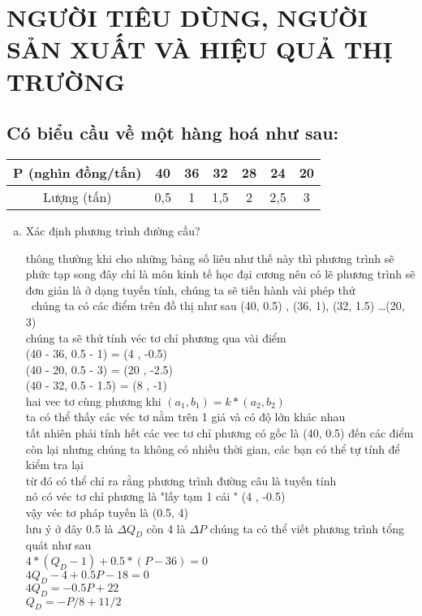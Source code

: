
\chapter{NGƯỜI TIÊU DÙNG, NGƯỜI SẢN XUẤT VÀ HIỆU QUẢ THỊ TRƯỜNG}
\section{  Có biểu cầu về một hàng hoá như sau:}

\begin{tabular}{|c|c|c|c|c|c|c|}
  \hline
  P (nghìn đồng/tấn) & 40  & 36 & 32  & 28 & 24  & 20 \\
  \hline
  Lượng (tấn)        & 0,5 & 1  & 1,5 & 2  & 2,5 & 3  \\
  \hline
\end{tabular}
\begin{enumerate}[a.]
  \item  Xác định phương trình đường cầu?

        thông thường khi cho những bảng số liêu như thế này thì phương trình sẽ phức tạp
        song đây chỉ là môn kinh tế học đại cương nên có lẽ phương trình sẽ đơn giản là ở
        dạng tuyến tính, chúng ta sẽ tiến hành vài phép thử \\\
        chúng ta có các điểm trên đồ thị như sau (40, 0.5) , (36, 1), (32, 1.5) \dots (20, 3) \\
        chúng ta sẽ thử tính véc tơ chỉ phương qua vài điểm \\
        (40 - 36, 0.5 - 1) = (4 , -0.5)\\
        (40 - 20, 0.5 - 3) = (20 , -2.5)\\
        (40 - 32, 0.5 - 1.5) = (8 , -1)\\
         hai vec tơ cùng phương khi $(a_1, b_1) = k * (a_2, b_2) $\\
        ta có thể thấy các véc tơ nằm trên 1 giá và có độ lớn khác nhau \\
        tất nhiên phải tính hết các vec tơ chỉ phương có gốc là (40, 0.5) đến các điểm còn lại
        nhưng chúng ta không có nhiều thời gian, các bạn có thể tự tính để kiểm tra lại \\
        từ đó có thể chỉ ra rằng phương trình đường câu là tuyến tính \\
        nó có véc tơ chỉ phương là "lấy tạm 1 cái "  (4 , -0.5) \\
        vậy véc tơ pháp tuyến là (0.5, 4) \\
        lưu ý ở đây 0.5 là $\Delta Q_D$ còn 4 là $\Delta P$
        chúng ta có thể viết phương trình tổng quát như sau \\
        $4 * (Q_D - 1) + 0.5 * (P - 36) = 0$ \\
        $4Q_D - 4 + 0.5 P - 18 = 0$\\
        $4Q_D = -0.5P + 22$\\
        $Q_D = -P/8 + 11 / 2$\\





\end{enumerate}
